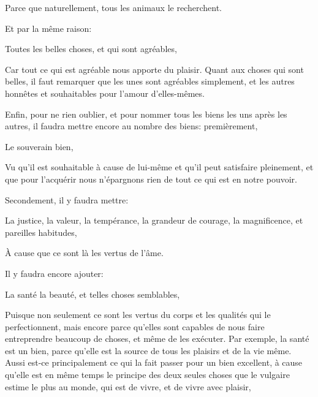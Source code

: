 Parce que naturellement, tous les animaux le recherchent.

\bigbreak

Et par la même raison:

\begin{emphpar}
     Toutes les belles choses, et qui sont agréables,
\end{emphpar}

Car tout ce qui est agréable nous apporte du plaisir. Quant aux choses qui sont belles, il faut remarquer que les unes sont
agréables simplement, et les autres honnêtes et souhaitables pour l'amour d'elles-mêmes. 

\bigbreak

Enfin, pour ne rien oublier, et pour nommer tous les biens les uns après les autres, il faudra mettre encore au nombre des
biens: premièrement,

\begin{emphpar}
     Le souverain bien,
\end{emphpar}

Vu qu'il est souhaitable à cause de lui-même et qu'il peut satisfaire pleinement, et que pour l'acquérir nous n'épargnons rien
de tout ce qui est en notre pouvoir.

\bigbreak

Secondement, il y faudra mettre:

\begin{emphpar}
     La justice, la valeur, la tempérance, la grandeur de courage, la magnificence, et pareilles habitudes,
\end{emphpar}

À cause que ce sont là les vertus de l'âme. 

\bigbreak

Il y faudra encore ajouter:

\begin{emphpar}
     La santé la beauté, et telles choses semblables,
\end{emphpar}

Puisque non seulement ce sont les vertus du corps et les qualités qui le perfectionnent, mais encore parce qu'elles sont capables
de nous faire entreprendre beaucoup de choses, et même de les exécuter. Par exemple, la santé est un bien, parce qu'elle est la
source de tous les plaisirs et de la vie même. Aussi est-ce principalement ce qui la fait passer pour un bien excellent, à cause
qu'elle est en même temps le principe des deux seules choses que le vulgaire estime le plus au monde, qui est de vivre, et de vivre
avec plaisir, 

